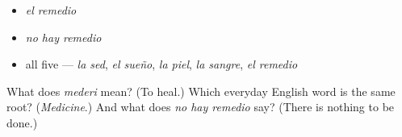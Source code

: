 \begin{itemize}
\raggedright
  \item \emph{el remedio}
  \item \emph{no hay remedio}
  \item all five — \emph{la sed}, \emph{el sueño}, \emph{la piel}, \emph{la sangre}, \emph{el remedio}
\end{itemize}

\begin{tcolorbox}[breakable,colback=teal!4,colframe=teal!35!black,title={Before you move on}]
What does \emph{mederi} mean? (To heal.) Which everyday English word is the same root? (\emph{Medicine}.) And what does \emph{no hay remedio} say? (There is nothing to be done.)
\end{tcolorbox}
